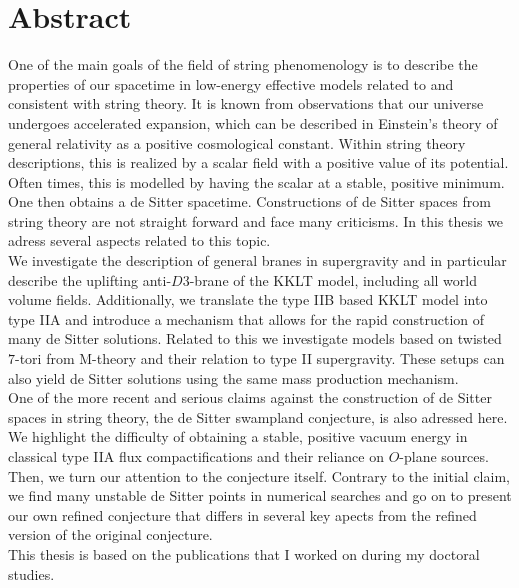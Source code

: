 \documentclass[a4paper,12pt]{report}
\begin{document}
\section*{Abstract}
One of the main goals of the field of string phenomenology is to describe the properties of our spacetime in low-energy effective models related to and consistent with string theory. It is known from observations that our universe undergoes accelerated expansion, which can be described in Einstein's theory of general relativity as a positive cosmological constant. Within string theory descriptions, this is realized by a scalar field with a positive value of its potential. Often times, this is modelled by having the scalar at a stable, positive minimum. One then obtains a de Sitter spacetime. Constructions of de Sitter spaces from string theory are not straight forward and face many criticisms. In this thesis we adress several aspects related to this topic.\\
We investigate the description of general branes in supergravity and in particular describe the uplifting anti-$D3$-brane of the KKLT model, including all world volume fields. Additionally, we translate the type IIB based KKLT model into type IIA and introduce a mechanism that allows for the rapid construction of many de Sitter solutions. Related to this we investigate models based on twisted $7$-tori from M-theory and their relation to type II supergravity. These setups can also yield de Sitter solutions using the same mass production mechanism.\\
One of the more recent and serious claims against the construction of de Sitter spaces in string theory, the de Sitter swampland conjecture, is also adressed here. We highlight the difficulty of obtaining a stable, positive vacuum energy in classical type IIA flux compactifications and their reliance on $O$-plane sources. Then, we turn our attention to the conjecture itself. Contrary to the initial claim, we find many unstable de Sitter points in numerical searches and go on to present our own refined conjecture that differs in several key apects from the refined version of the original conjecture.\vspace{12pt}\\
This thesis is based on the publications \cite{Roupec:2018mbn,Banlaki:2018ayh,Andriot:2018mav,Cribiori:2019hod,Cribiori:2019bfx,Cribiori:2019drf,Cribiori:2019hrb,Cribiori:2020bgt} that I worked on during my doctoral studies.

\newpage
\end{document}
